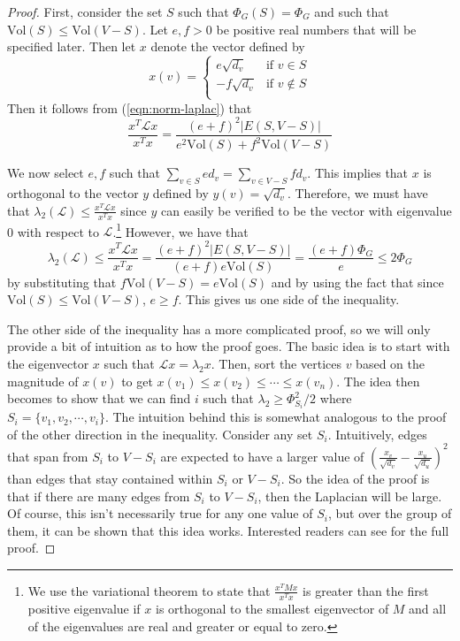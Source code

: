 \documentclass[12pt,twoside]{article}
\begin{document}
\begin{proof}
First, consider the set $S$ such that $\Phi_G(S) = \Phi_G$ and such that $\text{Vol}(S) \leq \text{Vol}(V-S)$. Let $e,f > 0$ be positive real numbers that will be specified later. Then let $x$ denote the vector defined by
%
\begin{equation*}
x(v)  = 
            \begin{cases}
                e\sqrt{d_v}     &\mbox{if $v \in S$} \\
                -f\sqrt{d_v}    &\mbox{if $v \notin S$} \\
            \end{cases}
\end{equation*}
%
Then it follows from (\ref{eqn:norm-laplac}) that
%
\begin{equation*}
\frac{x^T\mathcal{L}x}{x^Tx} = \frac{(e+f)^2|E(S,V-S)|}{e^2\text{Vol}(S) + f^2\text{Vol}(V - S)}
\end{equation*}

We now select $e,f$ such that $\sum_{v \in S} e d_v = \sum_{v \in V-S} f d_v$. This implies that $x$ is orthogonal to the vector $y$ defined by $y(v) = \sqrt{d_v}$. Therefore, we must have that $\lambda_2(\mathcal{L}) \leq \frac{x^T \mathcal{L} x}{x^T x} $ since $y$ can easily be verified to be the vector with eigenvalue 0 with respect to $\mathcal{L}$.\footnote{We use the variational theorem to state that $\frac{x^T M x}{x^Tx}$ is greater than the first positive eigenvalue if $x$ is orthogonal to the smallest eigenvector of $M$ and all of the eigenvalues are real and greater or equal to zero.} However, we have that
%
\begin{equation}
\lambda_2(\mathcal{L}) \leq \frac{x^T\mathcal{L}x}{x^Tx}  
    = \frac{(e+f)^2|E(S,V-S)|}{(e + f)e\text{Vol}(S)}
    = \frac{(e+f)\Phi_G}{e} \leq 2\Phi_G
\end{equation}
%
by substituting that $f\text{Vol}(V-S) = e\text{Vol}(S)$ and by using the fact that since $\text{Vol}(S) \leq \text{Vol}(V - S)$, $e \geq f$. This gives us one side of the inequality. 
 
The other side of the inequality has a more complicated proof, so we will only provide a bit of intuition as to how the proof goes. The basic idea is to start with the eigenvector $x$ such that $\mathcal{L}x = \lambda_2x$. Then, sort the vertices $v$ based on the magnitude of $x(v)$ to get $x(v_1) \leq x(v_2) \leq \cdots \leq x(v_n)$. The idea then becomes to show that we can find $i$ such that $\lambda_2 \geq \Phi_{S_i}^2/2$ where $S_i = \{v_1, v_2, \cdots, v_i\}$. The intuition behind this is somewhat analogous to the proof of the other direction in the inequality. Consider any set $S_i$. Intuitively, edges that span from $S_i$ to $V-S_i$ are expected to have a larger value of $(\frac{x_v}{\sqrt{d_v}} - \frac{x_u}{\sqrt{d_u}})^2$ than edges that stay contained within $S_i$ or $V-S_i$. So the idea of the proof is that if there are many edges from $S_i$ to $V-S_i$, then the Laplacian will be large. Of course, this isn't necessarily true for any one value of $S_i$, but over the group of them, it can be shown that this idea works. Interested readers can see \cite{cheeger} for the full proof. 

\end{proof}
\end{document}
